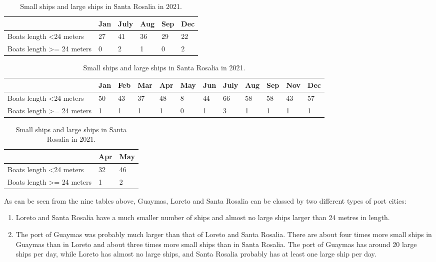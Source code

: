 \begin{table}[h!]
\begin{tabular}{|l|l|l|l|l|l|}
\hline
                                       & Jan & July & Aug & Sep & Dec \\ \hline
Boats length \textless 24 meters       & 27  & 41   & 36  & 29  & 22  \\ \hline
Boats length \textgreater{}= 24 meters & 0   & 2    & 1   & 0   & 2   \\ \hline
\end{tabular}
\caption{Small ships and large ships in Santa Rosalia in 2019.}

\begin{tabular}{|p{2.4cm}|l|l|l|l|l|l|l|l|l|l|l|}
\hline
                                       & Jan & Feb & Mar & Apr & May & Jun & July & Aug & Sep & Nov & Dec \\ \hline
Boats length \textless 24 meters       & 50  & 43  & 37  & 48  & 8   & 44  & 66   & 58  & 58  & 43  & 57  \\ \hline
Boats length \textgreater{}= 24 meters & 1   & 1   & 1   & 1   & 0   & 1   & 3    & 1   & 1   & 1   & 1   \\ \hline
\end{tabular}
\caption{Small ships and large ships in Santa Rosalia in 2020.}

\begin{tabular}{|l|l|l|}
\hline
                                       & Apr & May \\ \hline
Boats length \textless 24 meters       & 32  & 46  \\ \hline
Boats length \textgreater{}= 24 meters & 1   & 2   \\ \hline
\end{tabular}
\caption{Small ships and large ships in Santa Rosalia in 2021.}
\label{table:4.9}
\end{table}



\newpage
As can be seen from the nine tables above, Guaymas, Loreto and Santa Rosalia can be classed by two different types of port cities:

\begin{enumerate}
    \item Loreto and Santa Rosalia have a much smaller number of ships and almost no large ships larger than 24 metres in length.
    \item The port of Guaymas was probably much larger than that of Loreto and Santa Rosalia. There are about four times more small ships in Guaymas than in Loreto and about three times more small ships than in Santa Rosalia. The port of Guaymas has around 20 large ships per day, while Loreto has almost no large ships, and Santa Rosalia probably has at least one large ship per day.
\end{enumerate}

